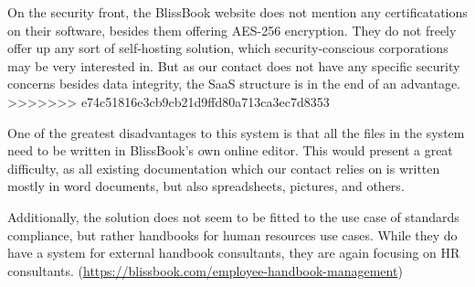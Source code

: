 On the security front, the BlissBook website does not mention any certificatations on their software, besides them offering AES-256 encryption. %
They do not freely offer up any sort of self-hosting solution, which security-conscious corporations may be very interested in. But as our contact does not have any specific security concerns besides data integrity, the SaaS structure is in the end of an advantage.
>>>>>>> e74c51816e3cb9cb21d9ffd80a713ca3ec7d8353

One of the greatest disadvantages to this system is that all the files in the system need to be written in BlissBook's own online editor. This would present a great difficulty, as all existing documentation which our contact relies on is written mostly in word documents, but also spreadsheets, pictures, and others.

Additionally, the solution does not seem to be fitted to the use case of standards compliance, but rather handbooks for human resources use cases. While they do have a system for external handbook consultants, they are again focusing on HR consultants. (\url{https://blissbook.com/employee-handbook-management})
